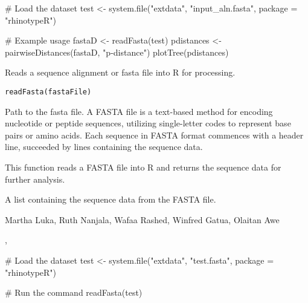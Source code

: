 \documentclass[a4paper]{book}
\begin{document}
%
\begin{SeeAlso}
\end{SeeAlso}
%
\begin{Examples}
\begin{ExampleCode}
# Load the dataset
test <- system.file("extdata", "input_aln.fasta", package = "rhinotypeR")

# Example usage
fastaD <- readFasta(test)
pdistances <- pairwiseDistances(fastaD, "p-distance")
plotTree(pdistances)
\end{ExampleCode}
\end{Examples}
%
\begin{Description}
Reads a sequence alignment or fasta file into R for processing.
\end{Description}
%
\begin{Usage}
\begin{verbatim}
readFasta(fastaFile)
\end{verbatim}
\end{Usage}
%
\begin{Arguments}
\begin{ldescription}
\item[\code{fastaFile}] 
Path to the fasta file. 
A FASTA file is a text-based method for encoding nucleotide or peptide sequences, 
utilizing single-letter codes to represent base pairs or amino acids. 
Each sequence in FASTA format commences with a header line, 
succeeded by lines containing the sequence data.

\end{ldescription}
\end{Arguments}
%
\begin{Details}
This function reads a FASTA file into R and returns the sequence data for further analysis.
\end{Details}
%
\begin{Value}
A list containing the sequence data from the FASTA file.
\end{Value}
%
\begin{Author}
Martha Luka, Ruth Nanjala, Wafaa Rashed, Winfred Gatua, Olaitan Awe 
\end{Author}
%
\begin{SeeAlso}
, 
\end{SeeAlso}
%
\begin{Examples}
\begin{ExampleCode}
# Load the dataset
test <- system.file("extdata", "test.fasta", package = "rhinotypeR")

# Run the command
readFasta(test)
\end{ExampleCode}
\end{Examples}
\end{document}
